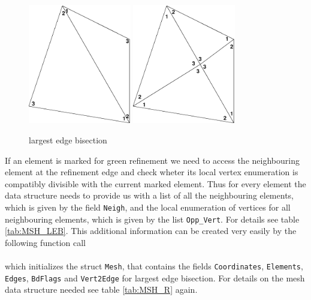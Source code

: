 \begin{figure}[htb]
  \centering
  \begin{minipage}[c]{0.7\textwidth}
    \includegraphics[width=0.4\textwidth]{LEB_org.eps} \hfill
    \includegraphics[width=0.4\textwidth]{LEB_ref.eps}
  \end{minipage}
  \caption{largest edge bisection}
  \label{fig:LEB}
\end{figure}

 If an element is marked for green refinement we need to access the neighbouring element at the refinement edge and check wheter its local vertex enumeration is compatibly divisible with the current marked element. Thus for every element the data structure needs to provide us with a list of all the neighbouring elements, which is given by the field {\tt Neigh}, and the local enumeration of vertices for all neighbouring elements, which is given by the list {\tt Opp\_Vert}. For details see table \ref{tab:MSH_LEB}. This additional information can be created very easily by the following function call \\

 \\

 \noindent which initializes the struct {\tt Mesh}, that contains the fields {\tt Coordinates}, {\tt Elements}, {\tt Edges}, {\tt BdFlags} and {\tt Vert2Edge} for largest edge bisection. For details on the mesh data structure needed see table \ref{tab:MSH_R} again.

